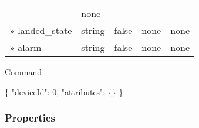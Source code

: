 \documentclass[
]{article}
\newenvironment{Shaded}{}{}
\newcommand{\DataTypeTok}[1]{\textcolor[rgb]{0.56,0.13,0.00}{#1}}
\newcommand{\DecValTok}[1]{\textcolor[rgb]{0.25,0.63,0.44}{#1}}
\newcommand{\FunctionTok}[1]{\textcolor[rgb]{0.02,0.16,0.49}{#1}}
\begin{document}
\begin{longtable}[]{@{}lllll@{}}
\begin{minipage}[t]{0.17\columnwidth}
\end{minipage} & \begin{minipage}[t]{0.17\columnwidth}\raggedright
none\strut
\end{minipage}\tabularnewline
\begin{minipage}[t]{0.17\columnwidth}\raggedright
» landed\_state\strut
\end{minipage} & \begin{minipage}[t]{0.17\columnwidth}\raggedright
string\strut
\end{minipage} & \begin{minipage}[t]{0.17\columnwidth}\raggedright
false\strut
\end{minipage} & \begin{minipage}[t]{0.17\columnwidth}\raggedright
none\strut
\end{minipage} & \begin{minipage}[t]{0.17\columnwidth}\raggedright
none\strut
\end{minipage}\tabularnewline
\begin{minipage}[t]{0.17\columnwidth}\raggedright
» alarm\strut
\end{minipage} & \begin{minipage}[t]{0.17\columnwidth}\raggedright
string\strut
\end{minipage} & \begin{minipage}[t]{0.17\columnwidth}\raggedright
false\strut
\end{minipage} & \begin{minipage}[t]{0.17\columnwidth}\raggedright
none\strut
\end{minipage} & \begin{minipage}[t]{0.17\columnwidth}\raggedright
none\strut
\end{minipage}\tabularnewline
\bottomrule
\end{longtable}

Command

\begin{Shaded}
\begin{Highlighting}[]
\FunctionTok{\{}
  \DataTypeTok{"deviceId"}\FunctionTok{:} \DecValTok{0}\FunctionTok{,}
  \DataTypeTok{"attributes"}\FunctionTok{:} \FunctionTok{\{\}}
\FunctionTok{\}}
\end{Highlighting}
\end{Shaded}

\hypertarget{properties-3}{%
\subsubsection{Properties}\label{properties-3}}
\end{document}
